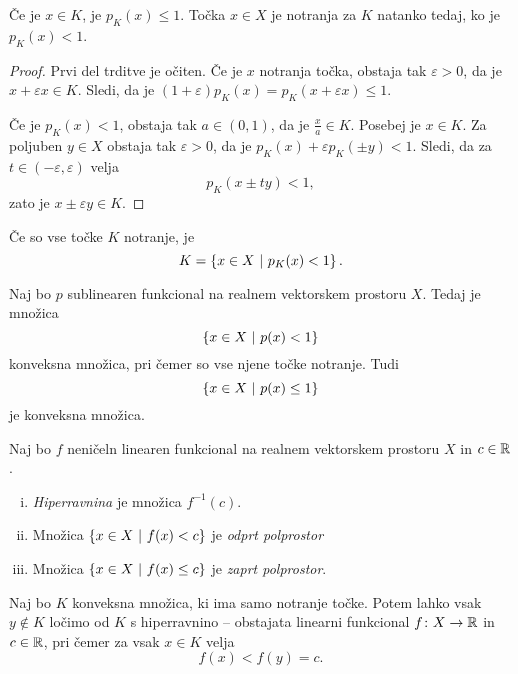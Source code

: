 \begin{trditev}
Če je $x \in K$, je $p_K(x) \leq 1$. Točka $x \in X$ je notranja za
$K$ natanko tedaj, ko je $p_K(x) < 1$.
\end{trditev}

\begin{proof}
Prvi del trditve je očiten. Če je $x$ notranja točka, obstaja tak
$\varepsilon > 0$, da je $x + \varepsilon x \in K$. Sledi, da je
$(1+\varepsilon) p_K(x) = p_K(x + \varepsilon x) \leq 1$.

Če je $p_K(x) < 1$, obstaja tak $a \in (0, 1)$, da je
$\frac{x}{a} \in K$. Posebej je $x \in K$. Za poljuben $y \in X$
obstaja tak $\varepsilon > 0$, da je
$p_K(x) + \varepsilon p_K(\pm y) < 1$. Sledi, da za
$t \in (-\varepsilon, \varepsilon)$ velja
\[
p_K(x \pm t y) < 1,
\]
zato je $x \pm \varepsilon y \in K$.
\end{proof}

\begin{opomba}
Če so vse točke $K$ notranje, je
\[
K = \left\{x \in X~\middle\vert~p_K(x) < 1\right\}.
\]
\end{opomba}

\begin{posledica}
Naj bo $p$ sublinearen funkcional na realnem vektorskem prostoru
$X$. Tedaj je množica
\[
\left\{x \in X~\middle\vert~p(x) < 1\right\}
\]
konveksna množica, pri čemer so vse njene točke notranje. Tudi
\[
\left\{x \in X~\middle\vert~p(x) \leq 1\right\}
\]
je konveksna množica.
\end{posledica}

\begin{definicija}
Naj bo $f$ neničeln linearen funkcional na realnem vektorskem
prostoru $X$ in $c \in \mathbb{R}$.

\begin{enumerate}[i)]
\item \emph{Hiperravnina} je
množica $f^{-1}(c)$.
\item Množica $\left\{x \in X~\middle\vert~f(x) < c\right\}$ je
\emph{odprt polprostor}
\item Množica $\left\{x \in X~\middle\vert~f(x) \leq c\right\}$ je
\emph{zaprt polprostor}.
\end{enumerate}
\end{definicija}

\begin{izrek}
Naj bo $K$ konveksna množica, ki ima samo notranje točke. Potem
lahko vsak $y \not \in K$ ločimo od $K$ s hiperravnino -- obstajata
linearni funkcional $f \colon X \to \mathbb{R}$ in $c \in \mathbb{R}$, pri čemer za
vsak $x \in K$ velja
\[
f(x) < f(y) = c.
\]
\end{izrek}

